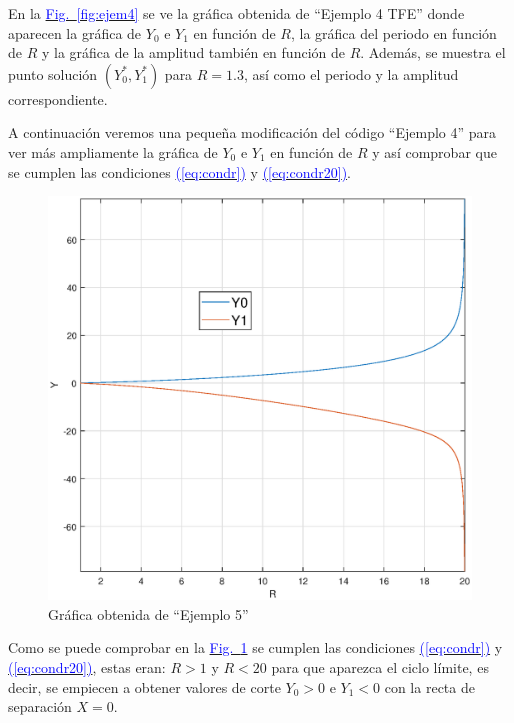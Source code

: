 \documentclass[12pt,a4paper]{report} %
\newcommand{\fref}[1]{\hyperref[#1]{\textcolor{blue}{Fig.~\ref*{#1}}}}
\newcommand{\eref}[1]{\hyperref[#1]{\textcolor{blue}{(\ref*{#1})}}}
\begin{document}
	\vspace{0.5cm}\noindent En la \fref{fig:ejem4} se ve la gráfica obtenida de ``Ejemplo 4 TFE'' donde aparecen la gráfica de $Y_0$ e $Y_1$ en función de $R$, la gráfica del periodo en función de $R$ y la gráfica de la amplitud también en función de $R$. Además, se muestra el punto solución $(Y_0^*,Y_1^*)$ para $R=1.3$, así como el periodo y la amplitud correspondiente.
	
	\newpage
	
	\vspace{0.5cm} A continuación veremos una pequeña modificación del código ``Ejemplo 4'' para ver más ampliamente la gráfica de $Y_0$ e $Y_1$ en función de $R$ y así comprobar que se cumplen las condiciones \eref{eq:condr} y \eref{eq:condr20}.
	
	
	\vspace{1cm}
	
	\newpage
	
	\begin{figure}[h]
		\centering
		\includegraphics[width=1\textwidth]{ejem5nuevo.eps}
		\caption{Gráfica obtenida de ``Ejemplo 5''}
		\label{fig:ry1ry0}
	\end{figure}\smallskip
	
	\vspace{0.5cm}\noindent Como se puede comprobar en la \fref{fig:ry1ry0} se cumplen las condiciones \eref{eq:condr} y \eref{eq:condr20}, estas eran: $R>1$ y $R<20$ para que aparezca el ciclo límite, es decir, se empiecen a obtener valores de corte $Y_0>0$ e $Y_1<0$ con la recta de separación $X=0$.
	
\end{document}
